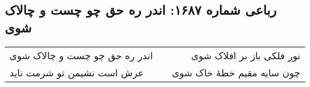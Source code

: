 \begin{center}
\section*{رباعی شماره ۱۶۸۷: اندر ره حق چو چست و چالاک شوی}
\label{sec:1687}
\begin{longtable}{l p{0.5cm} r}
اندر ره حق چو چست و چالاک شوی
&&
نور فلکی باز بر افلاک شوی
\\
عرش است نشیمن تو شرمت ناید
&&
چون سایه مقیم خطهٔ خاک شوی
\\
\end{longtable}
\end{center}
